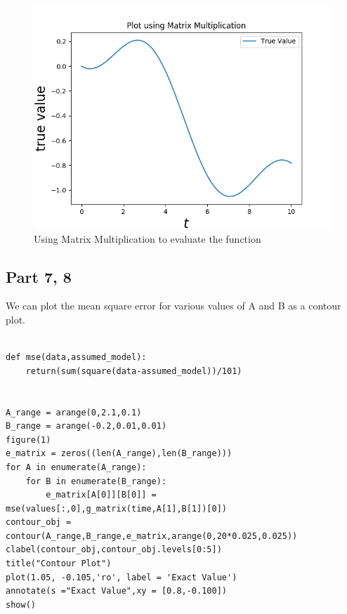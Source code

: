 \documentclass[11pt, a4paper]{article}
\begin{document}
\begin{figure}[!tbh]
   	\centering
   	\includegraphics[scale=0.5]{Assignment_3_Qn6.png}
   	\caption{Using Matrix Multiplication to evaluate the function}
   	\label{fig:trueMatrix}
   \end{figure}

 \subsection{Part 7, 8}
 We can plot the mean square error for various values of A and B as a contour plot.
 \begin{verbatim}

def mse(data,assumed_model):
    return(sum(square(data-assumed_model))/101)


A_range = arange(0,2.1,0.1)
B_range = arange(-0.2,0.01,0.01)
figure(1)
e_matrix = zeros((len(A_range),len(B_range)))
for A in enumerate(A_range):
	for B in enumerate(B_range):
		e_matrix[A[0]][B[0]] = mse(values[:,0],g_matrix(time,A[1],B[1])[0])
contour_obj = contour(A_range,B_range,e_matrix,arange(0,20*0.025,0.025))
clabel(contour_obj,contour_obj.levels[0:5])
title("Contour Plot")
plot(1.05, -0.105,'ro', label = 'Exact Value')
annotate(s ="Exact Value",xy = [0.8,-0.100])
show()
\end{verbatim}
\end{document}
